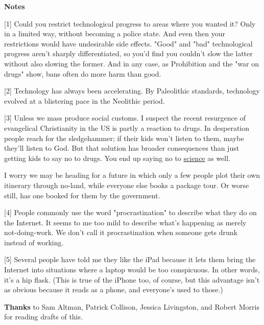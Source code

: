                   \textbf{Notes}

[1] Could you restrict technological progress to areas where
                  you wanted it? Only in a limited way, without becoming a
                  police state. And even then your restrictions would have
                  undesirable side effects. "Good" and "bad" technological
                  progress aren't sharply differentiated, so you'd find you
                  couldn't slow the latter without also slowing the former. And
                  in any case, as Prohibition and the "war on drugs" show, bans
                  often do more harm than good.

[2] Technology has always been accelerating. By Paleolithic
                  standards, technology evolved at a blistering pace in the
                  Neolithic period.

[3] Unless we mass produce social customs. I suspect the recent
                  resurgence of evangelical Christianity in the US is partly a
                  reaction to drugs. In desperation people reach for the
                  sledgehammer; if their kids won't listen to them, maybe
                  they'll listen to God. But that solution has broader
                  consequences than just getting kids to say no to drugs. You
                  end up saying no to
                  \href{https://www.youtube.com/watch?v=GbXgsMxOPtI}{science}
                  as well.
                  

I
                  worry we may be heading for a future in which only a few
                  people plot their own itinerary through no-land, while
                  everyone else books a package tour. Or worse still, has one
                  booked for them by the government.

[4] People commonly use the word "procrastination" to describe
                  what they do on the Internet. It seems to me too mild to
                  describe what's happening as merely not-doing-work. We don't
                  call it procrastination when someone gets drunk instead of
                  working.

[5] Several people have told me they like the iPad because it
                  lets them bring the Internet into situations where a laptop
                  would be too conspicuous. In other words, it's a hip flask.
                  (This is true of the iPhone too, of course, but this advantage
                  isn't as obvious because it reads as a phone, and everyone's
                  used to those.)

\textbf{Thanks} to Sam Altman,
                  Patrick Collison, Jessica Livingston, and Robert Morris for
                  reading drafts of this.


              
            
          
            
              
                


                  
              
            
          
